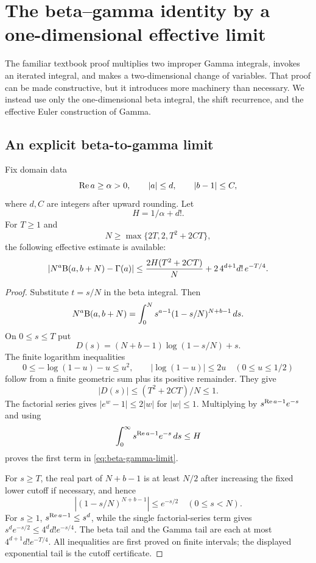 \section{The beta--gamma identity by a one-dimensional effective limit}
\label{sec:betagamma}

The familiar textbook proof multiplies two improper Gamma integrals, invokes an iterated integral, and makes a two-dimensional change of variables.  That proof can be made constructive, but it introduces more machinery than necessary.  We instead use only the one-dimensional beta integral, the shift recurrence, and the effective Euler construction of Gamma.

\subsection{An explicit beta-to-gamma limit}

Fix domain data
\[
 \operatorname{Re} a\ge\alpha>0,
 \qquad |a|\le d,
 \qquad |b-1|\le C,
\]
where $d,C$ are integers after upward rounding.  Let
\[
 H=1/\alpha+d!.
\]
For $T\ge1$ and
\[
 N\ge\max\{2T,2,T^2+2CT\},
\]
the following effective estimate is available:
\begin{equation}
 \left|N^a\mathrm B(a,b+N)-\Gamma(a)\right|
 \le \frac{2H(T^2+2CT)}{N}
       +2\,4^{d+1}d!\,e^{-T/4}.
 \label{eq:beta-gamma-limit}
\end{equation}

\begin{proof}
Substitute $t=s/N$ in the beta integral.  Then
\[
 N^a\mathrm B(a,b+N)=
 \int_0^N s^{a-1}(1-s/N)^{N+b-1}\,ds.
\]
On $0\le s\le T$ put
\[
 D(s)=(N+b-1)\log(1-s/N)+s.
\]
The finite logarithm inequalities
\[
 0\le-\log(1-u)-u\le u^2,
 \qquad |\log(1-u)|\le2u
 \quad(0\le u\le1/2)
\]
follow from a finite geometric sum plus its positive remainder.  They give
\[
 |D(s)|\le (T^2+2CT)/N\le1.
\]
The factorial series gives $|e^w-1|\le2|w|$ for $|w|\le1$.  Multiplying by $s^{\operatorname{Re} a-1}e^{-s}$ and using
\[
 \int_0^\infty s^{\operatorname{Re} a-1}e^{-s}\,ds\le H
\]
proves the first term in \eqref{eq:beta-gamma-limit}.

For $s\ge T$, the real part of $N+b-1$ is at least $N/2$ after increasing the fixed lower cutoff if necessary, and hence
\[
 |(1-s/N)^{N+b-1}|\le e^{-s/2}
 \quad(0\le s<N).
\]
For $s\ge1$, $s^{\operatorname{Re} a-1}\le s^d$, while the single factorial-series term gives
$s^de^{-s/2}\le4^d d!e^{-s/4}$.  The beta tail and the Gamma tail are each at most $4^{d+1}d!e^{-T/4}$.  All inequalities are first proved on finite intervals; the displayed exponential tail is the cutoff certificate.
\end{proof}

